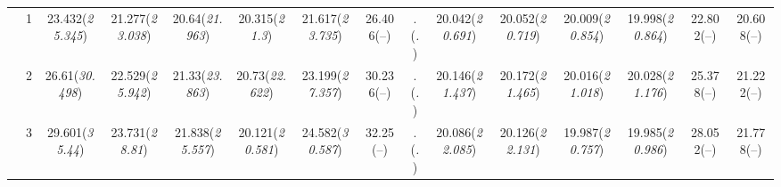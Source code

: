 \documentclass{article}
\begin{document}
\begin{table}[tbp]
{\begin{tabularx}{\textwidth}{lCCCCCCCCCCCCCC}
&1&23.432\newline (\emph{25.345})&21.277\newline (\emph{23.038})&20.64\newline (\emph{21.963})&20.315\newline (\emph{21.3})&21.617\newline (\emph{23.735})&26.406\newline (--)&.\newline (\emph{.})&20.042\newline (\emph{20.691})&20.052\newline (\emph{20.719})&20.009\newline (\emph{20.854})&19.998\newline (\emph{20.864})&22.802\newline (--)&20.608\newline (--) \tabularnewline
&2&26.61\newline (\emph{30.498})&22.529\newline (\emph{25.942})&21.33\newline (\emph{23.863})&20.73\newline (\emph{22.622})&23.199\newline (\emph{27.357})&30.236\newline (--)&.\newline (\emph{.})&20.146\newline (\emph{21.437})&20.172\newline (\emph{21.465})&20.016\newline (\emph{21.018})&20.028\newline (\emph{21.176})&25.378\newline (--)&21.222\newline (--) \tabularnewline
&3&29.601\newline (\emph{35.44})&23.731\newline (\emph{28.81})&21.838\newline (\emph{25.557})&20.121\newline (\emph{20.581})&24.582\newline (\emph{30.587})&32.25\newline (--)&.\newline (\emph{.})&20.086\newline (\emph{22.085})&20.126\newline (\emph{22.131})&19.987\newline (\emph{20.757})&19.985\newline (\emph{20.986})&28.052\newline (--)&21.778\newline (--) \tabularnewline

\end{tabularx}}
\end{table}
\end{document}
